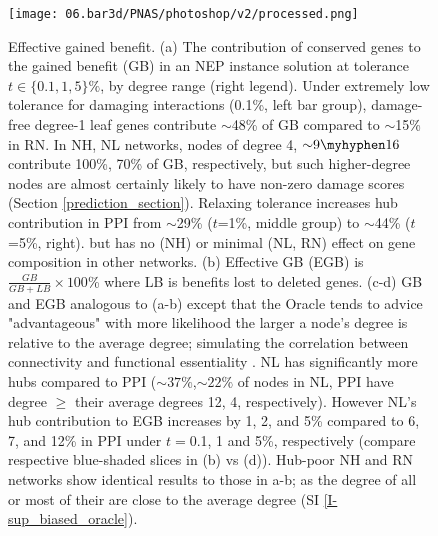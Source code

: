 			\begin{figure}[t]
                \centering
						\texttt{[image: 06.bar3d/PNAS/photoshop/v2/processed.png]}
						\caption{Effective gained benefit.
						(a) The contribution of conserved genes to the gained benefit (GB) in an NEP instance solution
						at tolerance $t\in\{0.1, 1, 5\}\%$,
						by degree range (right legend). Under extremely low tolerance for damaging interactions (0.1\%, left
						bar group), damage-free degree-1 leaf genes contribute $\sim$48\% of GB compared to ${\sim}$15\% in RN.
						In NH, NL networks, nodes of degree 4, ${\sim}9\myhyphen 16$ contribute 100\%, 70\% of GB, respectively,
						but such higher-degree nodes
						are almost certainly likely to have non-zero damage scores  (Section \ref{prediction_section}).
						Relaxing tolerance increases hub contribution in PPI from  ${\sim}$29\% ($t$=1\%, middle group) to ${\sim}$44\% ($t$=5\%, right).
						but has no (NH) or minimal (NL, RN) effect on gene composition in other networks.
						(b) Effective GB (EGB) is  $\frac{GB}{GB+LB}\times 100$\% where LB is benefits lost to deleted genes.
						(c-d) GB and EGB analogous to (a-b) except that the Oracle tends to advice "advantageous" with more likelihood
						the larger a node's degree is relative to the average degree; simulating the correlation between connectivity and functional essentiality  \cite{gerstein_architecture_2012}.
						NL has significantly more hubs compared to PPI
	             		(${\sim}37\%$,${\sim}22\%$ of nodes in NL, PPI have degree $\geq$  their average degrees 12, 4, respectively).
	             		However NL's hub contribution to EGB
                        increases by 1, 2, and 5\%
                        compared to 6, 7, and 12\% in PPI under $t=$0.1, 1 and 5\%, respectively
                        (compare respective blue-shaded slices in (b) vs (d)).
						Hub-poor NH and RN networks show identical results to those in a-b; as the degree of all or most of their are close to the average degree (SI \ref{I-sup_biased_oracle}).}
						\label{EGB}
			\end{figure}
